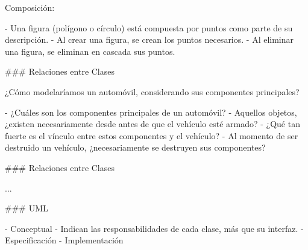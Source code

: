 Composición:

- Una figura (polígono o círculo) está compuesta por puntos como parte
de su descripción.
- Al crear una figura, se crean los puntos necesarios.
- Al eliminar una figura, se eliminan en cascada sus puntos.

### Relaciones entre Clases

\newline

¿Cómo modelaríamos un automóvil, considerando sus componentes principales?

- ¿Cuáles son los componentes principales de un automóvil?
- Aquellos objetos, ¿existen necesariamente desde antes de que el vehículo
esté armado?
- ¿Qué tan fuerte es el vínculo entre estos componentes y el vehículo?
- Al momento de ser destruido un vehículo, ¿necesariamente se destruyen
sus componentes?

### Relaciones entre Clases

\newline

...


### UML

\newline

- Conceptual
    - Indican las responsabilidades de cada clase, más que su interfaz.
- Especificación
- Implementación
